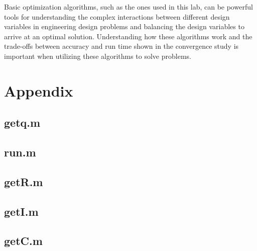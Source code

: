 \documentclass[11pt]{article}%
\begin{document}
 Basic optimization algorithms, such as the ones used in this lab, can be powerful tools for understanding the complex interactions between different design variables in engineering design problems and balancing the design variables to arrive at an optimal solution. Understanding how these algorithms work and the trade-offs between accuracy and run time shown in the convergence study is important when utilizing these algorithms to solve problems. 

\printbibliography
\newpage
\section{Appendix}

\subsection{getq.m}
\label{sec:getq}

\newpage
\subsection{run.m}
\label{sec:run}

\newpage
\subsection{getR.m}
\label{sec:getR}

\newpage
\subsection{getI.m}
\label{sec:getI}

\newpage
\subsection{getC.m}
\label{sec:getC}

\newpage
\end{document}
